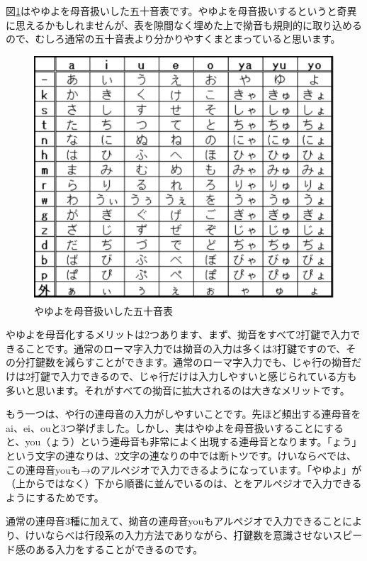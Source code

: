 図\ref{keinarabe_50on}はやゆよを母音扱いした五十音表です。やゆよを母音扱いするというと奇異に思えるかもしれませんが、表を隙間なく埋めた上で拗音も規則的に取り込めるので、むしろ通常の五十音表より分かりやすくまとまっていると思います。


\begin{figure}
 \begin{center}
   \includegraphics[width=14cm,clip]{res_kouy/keinarabe_50on.eps}
 \end{center}
 \caption{やゆよを母音扱いした五十音表}
 \label{keinarabe_50on}
\end{figure}

やゆよを母音化するメリットは2つあります、まず、拗音をすべて2打鍵で入力できることです。通常のローマ字入力では拗音の入力は多くは3打鍵ですので、その分打鍵数を減らすことができます。通常のローマ字入力でも、じゃ行の拗音だけは2打鍵で入力できるので、じゃ行だけは入力しやすいと感じられている方も多いと思います。それがすべての拗音に拡大されるのは大きなメリットです。

もう一つは、や行の連母音の入力がしやすいことです。先ほど頻出する連母音をai、ei、ouと3つ挙げました。しかし、実はやゆよを母音扱いすることにすると、you（ょう）という連母音も非常によく出現する連母音となります。「ょう」という文字の連なりは、2文字の連なりの中では断トツです。けいならべでは、この連母音youも→のアルペジオで入力できるようになっています。「やゆよ」が（上からではなく）下から順番に並んでいるのは、とをアルペジオで入力できるようにするためです。

通常の連母音3種に加えて、拗音の連母音youもアルペジオで入力できることにより、けいならべは行段系の入力方法でありながら、打鍵数を意識させないスピード感のある入力をすることができるのです。
